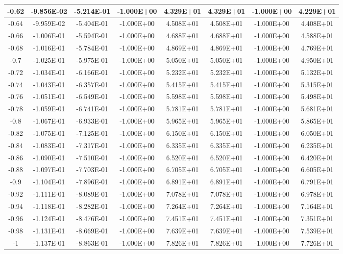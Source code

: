 \documentclass{article}
\begin{document}
\begin{center}
\begin{longtable}{|c|c|c|c|c|c|c|c|}
        -0.62 & -9.856E-02 & -5.214E-01 & -1.000E+00 & 4.329E+01 & 4.329E+01 & -1.000E+00 & 4.229E+01 \\ \hline
        -0.64 & -9.959E-02 & -5.404E-01 & -1.000E+00 & 4.508E+01 & 4.508E+01 & -1.000E+00 & 4.408E+01 \\ \hline
        -0.66 & -1.006E-01 & -5.594E-01 & -1.000E+00 & 4.688E+01 & 4.688E+01 & -1.000E+00 & 4.588E+01 \\ \hline
        -0.68 & -1.016E-01 & -5.784E-01 & -1.000E+00 & 4.869E+01 & 4.869E+01 & -1.000E+00 & 4.769E+01 \\ \hline
        -0.7 & -1.025E-01 & -5.975E-01 & -1.000E+00 & 5.050E+01 & 5.050E+01 & -1.000E+00 & 4.950E+01 \\ \hline
        -0.72 & -1.034E-01 & -6.166E-01 & -1.000E+00 & 5.232E+01 & 5.232E+01 & -1.000E+00 & 5.132E+01 \\ \hline
        -0.74 & -1.043E-01 & -6.357E-01 & -1.000E+00 & 5.415E+01 & 5.415E+01 & -1.000E+00 & 5.315E+01 \\ \hline
        -0.76 & -1.051E-01 & -6.549E-01 & -1.000E+00 & 5.598E+01 & 5.598E+01 & -1.000E+00 & 5.498E+01 \\ \hline
        -0.78 & -1.059E-01 & -6.741E-01 & -1.000E+00 & 5.781E+01 & 5.781E+01 & -1.000E+00 & 5.681E+01 \\ \hline
        -0.8 & -1.067E-01 & -6.933E-01 & -1.000E+00 & 5.965E+01 & 5.965E+01 & -1.000E+00 & 5.865E+01 \\ \hline
        -0.82 & -1.075E-01 & -7.125E-01 & -1.000E+00 & 6.150E+01 & 6.150E+01 & -1.000E+00 & 6.050E+01 \\ \hline
        -0.84 & -1.083E-01 & -7.317E-01 & -1.000E+00 & 6.335E+01 & 6.335E+01 & -1.000E+00 & 6.235E+01 \\ \hline
        -0.86 & -1.090E-01 & -7.510E-01 & -1.000E+00 & 6.520E+01 & 6.520E+01 & -1.000E+00 & 6.420E+01 \\ \hline
        -0.88 & -1.097E-01 & -7.703E-01 & -1.000E+00 & 6.705E+01 & 6.705E+01 & -1.000E+00 & 6.605E+01 \\ \hline
        -0.9 & -1.104E-01 & -7.896E-01 & -1.000E+00 & 6.891E+01 & 6.891E+01 & -1.000E+00 & 6.791E+01 \\ \hline
        -0.92 & -1.111E-01 & -8.089E-01 & -1.000E+00 & 7.078E+01 & 7.078E+01 & -1.000E+00 & 6.978E+01 \\ \hline
        -0.94 & -1.118E-01 & -8.282E-01 & -1.000E+00 & 7.264E+01 & 7.264E+01 & -1.000E+00 & 7.164E+01 \\ \hline
        -0.96 & -1.124E-01 & -8.476E-01 & -1.000E+00 & 7.451E+01 & 7.451E+01 & -1.000E+00 & 7.351E+01 \\ \hline
        -0.98 & -1.131E-01 & -8.669E-01 & -1.000E+00 & 7.639E+01 & 7.639E+01 & -1.000E+00 & 7.539E+01 \\ \hline
        -1 & -1.137E-01 & -8.863E-01 & -1.000E+00 & 7.826E+01 & 7.826E+01 & -1.000E+00 & 7.726E+01 \\ \hline
    \end{longtable}
\end{center}
\end{document}
